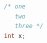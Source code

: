 \documentclass{article}
\begin{document}
\begin{tcolorbox}
\begin{lstlisting}[language=C]
/* one
   two
   three */
int x;
\end{lstlisting}
\end{tcolorbox}
\end{document}
